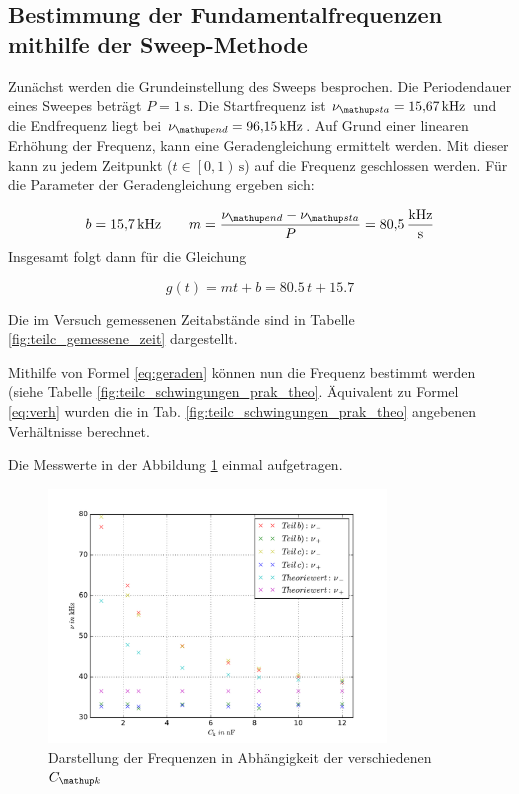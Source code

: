 \subsection{Bestimmung der Fundamentalfrequenzen mithilfe der Sweep-Methode}
Zunächst werden die Grundeinstellung des Sweeps besprochen.
Die Periodendauer eines Sweepes beträgt $P=\SI{1}{\second}$.
Die Startfrequenz ist $\nu\ua{sta}=\SI{15.67}{\kilo\hertz}$ und die
Endfrequenz liegt bei $\nu\ua{end}=\SI{96.15}{\kilo\hertz}$.
Auf Grund einer linearen Erhöhung der Frequenz, kann eine Geradengleichung ermittelt werden. 
Mit dieser kann zu jedem Zeitpunkt ($t\in\left[0,1\right)\,\si{\second}$) auf die Frequenz geschlossen werden.
Für die Parameter der Geradengleichung ergeben sich:

\begin{equation*}
b=\SI{15.7}{\kilo\hertz} \qquad m=\frac{\nu\ua{end}-\nu\ua{sta}}{P}=\SI{80.5}{\kilo\hertz\per\second}
\end{equation*}
Insgesamt folgt dann für die Gleichung

\begin{equation}
\label{eq:geraden}
g(t)=mt+b=80.5\,t+15.7
\end{equation}

Die im Versuch gemessenen Zeitabstände sind in Tabelle \ref{fig:teilc_gemessene_zeit} dargestellt.


Mithilfe von Formel \eqref{eq:geraden} können nun die Frequenz bestimmt werden (siehe Tabelle \ref{fig:teilc_schwingungen_prak_theo}.
Äquivalent zu Formel \eqref{eq:verh} wurden die in Tab. \ref{fig:teilc_schwingungen_prak_theo} angebenen Verhältnisse berechnet.

Die Messwerte in der Abbildung \ref{fig: plot} einmal aufgetragen.
\begin{figure}
  \centering
  \includegraphics[width=0.8\textwidth]{pics/plot_frequenzen.pdf}
  \caption{Darstellung der Frequenzen in Abhängigkeit der verschiedenen $C\ua{k}$}
  \label{fig: plot}
\end{figure}